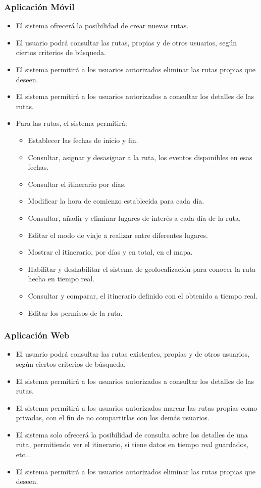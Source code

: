\subsubsection*{Aplicación Móvil}
\begin{itemize}
\setlength\itemsep{1pt}
\item El sistema ofrecerá la posibilidad de crear nuevas rutas.
\item El usuario podrá consultar las rutas, propias y de otros usuarios, según ciertos criterios de búsqueda.
\item El sistema permitirá a los usuarios autorizados eliminar las rutas propias que deseen.
\item El sistema permitirá a los usuarios autorizados a consultar los detalles de las rutas.
\item Para las rutas, el sistema permitirá:
	\begin{itemize}
	\item Establecer las fechas de inicio y fin.
	\item Consultar, asignar y desasignar a la ruta, los eventos disponibles en esas fechas.
	\item Consultar el itinerario por días.
	\item Modificar la hora de comienzo establecida para cada día.
	\item Consultar, añadir y eliminar lugares de interés a cada día de la ruta.
	\item Editar el modo de viaje a realizar entre diferentes lugares.
	\item Mostrar el itinerario, por días y en total, en el mapa.
	\item Habilitar y deshabilitar el sistema de geolocalización para conocer la ruta hecha en tiempo real.
	\item Consultar y comparar, el itinerario definido con el obtenido a tiempo real.
	\item Editar los permisos de la ruta.
	\end{itemize}
\end{itemize}

\subsubsection*{Aplicación Web}
\begin{itemize}
\setlength\itemsep{1pt}
\item El usuario podrá consultar las rutas existentes, propias y de otros usuarios, según ciertos criterios de búsqueda.
\item El sistema permitirá a los usuarios autorizados a consultar los detalles de las rutas.
\item El sistema permitirá a los usuarios autorizados marcar las rutas propias como privadas, con el fin de no compartirlas con los demás usuarios.
\item El sistema solo ofrecerá la posibilidad de consulta sobre los detalles de una ruta, permitiendo ver el itinerario, si tiene datos en tiempo real guardados, etc...
\item El sistema permitirá a los usuarios autorizados eliminar las rutas propias que deseen.
\end{itemize}

